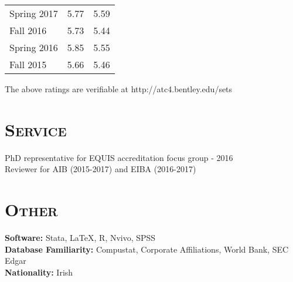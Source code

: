 \documentclass[margin, 12pt]{res}
\begin{document}
\begin{resume}
\begin{table}[htbp]
\begin{tabular}{lrr}
    Spring 2017 & 5.77  & 5.59 \\
    Fall 2016 & 5.73  & 5.44 \\
    Spring 2016 & 5.85  & 5.55 \\
    Fall 2015 & 5.66  & 5.46 \\
    \bottomrule


    \end{tabular}%
    
  The above ratings are verifiable at http://atc4.bentley.edu/sets    
  \label{tab:addlabel}%
\end{table}%
 
 \section{\normalfont\textsc{Service}}
PhD representative for EQUIS accreditation focus group - 2016 \\
Reviewer for AIB (2015-2017) and EIBA (2016-2017)




 
\section{\normalfont\textsc{Other}}
\textbf{Software:} Stata, \LaTeX, R, Nvivo, SPSS \\
\textbf{Database Familiarity:} Compustat, Corporate Affiliations, World Bank, SEC Edgar   \\
\textbf{Nationality:} Irish  \\

\end{resume}
\end{document}
